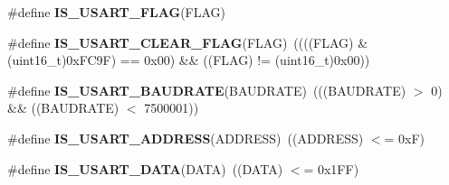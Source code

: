 \begin{DoxyCompactItemize}
\item 
\#define \textbf{ I\+S\+\_\+\+U\+S\+A\+R\+T\+\_\+\+F\+L\+AG}(F\+L\+AG)
\item 
\#define \textbf{ I\+S\+\_\+\+U\+S\+A\+R\+T\+\_\+\+C\+L\+E\+A\+R\+\_\+\+F\+L\+AG}(F\+L\+AG)~((((F\+L\+AG) \& (uint16\+\_\+t)0x\+F\+C9\+F) == 0x00) \&\& ((\+F\+L\+A\+G) != (uint16\+\_\+t)0x00))
\item 
\#define \textbf{ I\+S\+\_\+\+U\+S\+A\+R\+T\+\_\+\+B\+A\+U\+D\+R\+A\+TE}(B\+A\+U\+D\+R\+A\+TE)~(((B\+A\+U\+D\+R\+A\+TE) $>$ 0) \&\& ((B\+A\+U\+D\+R\+A\+TE) $<$ 7500001))
\item 
\#define \textbf{ I\+S\+\_\+\+U\+S\+A\+R\+T\+\_\+\+A\+D\+D\+R\+E\+SS}(A\+D\+D\+R\+E\+SS)~((A\+D\+D\+R\+E\+SS) $<$= 0x\+F)
\item 
\#define \textbf{ I\+S\+\_\+\+U\+S\+A\+R\+T\+\_\+\+D\+A\+TA}(D\+A\+TA)~((D\+A\+TA) $<$= 0x1\+F\+F)
\end{DoxyCompactItemize}
